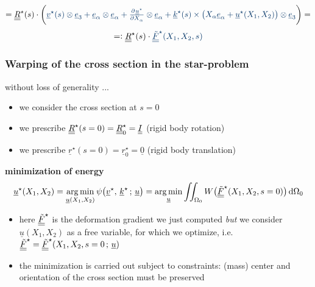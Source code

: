 \begin{frame}
\begin{displaymath}
    = \doubleunderline{R}^{\star}(s) \cdot \biggl( {\color{faublue}
        \underline{v}^{\star}(s) \otimes \underline{e}_3 + 
        \underline{e}_{\alpha} \otimes \underline{e}_{\alpha} + 
        \pd{\underline{u}^{\star}}{X_{\alpha}} \otimes \underline{e}_{\alpha} +
        \underline{k}^{\star}(s) \times \bigl( X_{\alpha} \underline{e}_{\alpha} + \underline{u}^{\star}(X_1,X_2) \bigr) \otimes \underline{e}_3 }
      \biggr) =
  \end{displaymath}
  \begin{displaymath}
    =: \doubleunderline{R}^{\star}(s) \cdot {\color{faublue} \doubleunderline{\tilde{F}}^{\star} (X_1,X_2,s) }
  \end{displaymath}
\end{frame}


\begin{frame}
  \frametitle{Warping of the cross section in the star-problem}
  without loss of generality ...
  \begin{itemize}
    \item we consider the cross section at $s=0$
    \item we prescribe $ \underline{\underline{R}}^{\star}(s=0) = \underline{\underline{R}}^{\star}_0 = \underline{\underline{I}}$ \: (rigid body rotation)
    \item we prescribe $ \underline{r}^{\star}(s=0) = \underline{r}^{\star}_0 = \underline{0}$ \: (rigid body translation)
  \end{itemize}

  \vspace{1em}
  \textbf{minimization of energy}
  \begin{displaymath}
    \underline{u}^{\star}(X_1,X_2) =
    \argmin_{\underline{u}(X_1,X_2)} \psi \bigl( \underline{v}^{\star}, \, \underline{k}^{\star} \, ; \, \underline{u} \bigr) =
    \argmin_{\underline{u}} \iint_{\Omega_0} W \bigl( \doubleunderline{\tilde{F}}^{\star}(X_1,X_2,s=0) \bigr)  \dif \Omega_0
  \end{displaymath}
  \begin{itemize}
    \item here $\underline{\underline{\tilde{F}}}^{\star}$ is the deformation gradient we just computed \textit{but} we consider $\underline{u}(X_1,X_2)$ as a free variable, for which we optimize, i.e. $\underline{\underline{\tilde{F}}}^{\star} = \underline{\underline{\tilde{F}}}^{\star}(X_1,X_2,s=0 \, ; \, \underline{u})$
    \item the minimization is carried out subject to constraints: \newline
      (mass) center and orientation of the cross section must be preserved 
  \end{itemize}
  
  
\end{frame}


